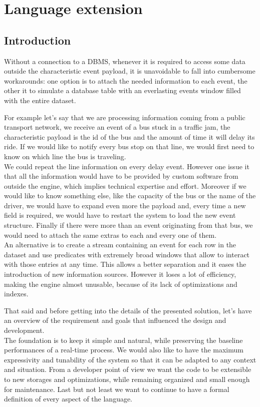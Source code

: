 \chapter{Language extension}

\section{Introduction}
\label{sec:intro-lang-extension}
Without a connection to a DBMS, whenever it is required to access some data outside the characteristic event payload, it is unavoidable to fall into cumbersome workarounds: one option is to attach the needed information to each event, the other it to simulate a database table with an everlasting events window filled with the entire dataset.

For example let's say that we are processing information coming from a public transport network, we receive an event of a bus stuck in a traffic jam, the characteristic payload is the id of the bus and the amount of time it will delay its ride. If we would like to notify every bus stop on that line, we would first need to know on which line the bus is traveling.\\
We could repeat the line information on every delay event. However one issue it that all the information would have to be provided by custom software from outside the engine, which implies technical expertise and effort. Moreover if we would like to know something else, like the capacity of the bus or the name of the driver, we would have to expand even more the payload and, every time a new field is required, we would have to restart the system to load the new event structure. Finally if there were more than an event originating from that bus, we would need to attach the same extras to each and every one of them.\\
An alternative is to create a stream containing an event for each row in the dataset and use predicates with extremely broad windows that allow to interact with those entries at any time. This allows a better separation and it eases the introduction of new information sources. However it loses a lot of efficiency, making the engine almost unusable, because of its lack of optimizations and indexes.

That said and before getting into the details of the presented solution, let's have an overview of the requirement and goals that influenced the design and development.\\
The foundation is to keep it simple and natural, while preserving the baseline performances of a real-time process. We would also like to have the maximum expressivity and tunability of the system so that it can be adapted to any context and situation. From a developer point of view we want the code to be extensible to new storages and optimizations, while remaining organized and small enough for maintenance. Last but not least we want to continue to have a formal definition of every aspect of the language.

